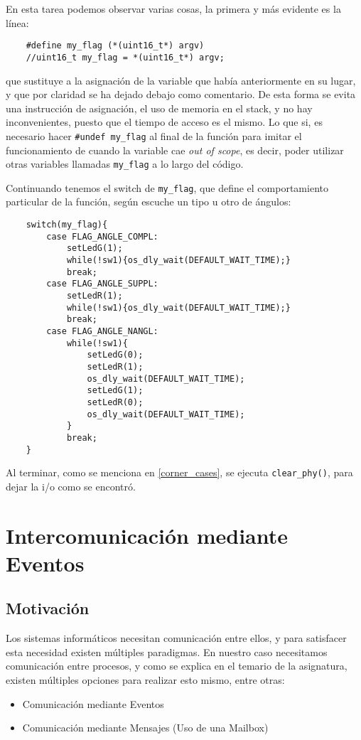 \documentclass[a4paper,openright,12pt]{article}
\begin{document}
En esta tarea podemos observar varias cosas, la primera y más evidente es la línea:
\begin{verbatim}
    #define my_flag (*(uint16_t*) argv)
    //uint16_t my_flag = *(uint16_t*) argv;
\end{verbatim}
que sustituye a la asignación de la variable que había anteriormente en su lugar, y que por claridad se ha dejado debajo como comentario. De esta forma se evita una instrucción de
asignación, el uso de memoria en el stack, y no hay inconvenientes, puesto que el tiempo de acceso es el mismo. Lo que si, es necesario hacer \texttt{\#undef my\_flag} al final de la
función para imitar el funcionamiento de cuando la variable cae \emph{out of scope}, es decir, poder utilizar otras variables llamadas \texttt{my\_flag} a lo largo del código. 

\bigskip

Continuando tenemos el switch de \texttt{my\_flag}, que define el comportamiento particular de la función, según escuche un tipo u otro de ángulos:
\begin{verbatim}
    switch(my_flag){
        case FLAG_ANGLE_COMPL:
            setLedG(1);
            while(!sw1){os_dly_wait(DEFAULT_WAIT_TIME);}
            break;
        case FLAG_ANGLE_SUPPL:
            setLedR(1);
            while(!sw1){os_dly_wait(DEFAULT_WAIT_TIME);}
            break;
        case FLAG_ANGLE_NANGL:
            while(!sw1){
                setLedG(0);
                setLedR(1);
                os_dly_wait(DEFAULT_WAIT_TIME);
                setLedG(1);
                setLedR(0);
                os_dly_wait(DEFAULT_WAIT_TIME);
            }
            break;
    }
\end{verbatim}

Al terminar, como se menciona en \ref{corner_cases}, se ejecuta \texttt{clear\_phy()}, para dejar la i/o como se encontró.


\clearpage
\section{Intercomunicación mediante Eventos}
\subsection{Motivación}
Los sistemas informáticos necesitan comunicación entre ellos, y para satisfacer esta necesidad existen múltiples paradigmas.
En nuestro caso necesitamos comunicación entre procesos, y como se explica en el temario de la asignatura, existen múltiples
opciones para realizar esto mismo, entre otras:
\begin{itemize}
    \item Comunicación mediante Eventos
    \item Comunicación mediante Mensajes (Uso de una Mailbox)
\end{itemize}
\end{document}
